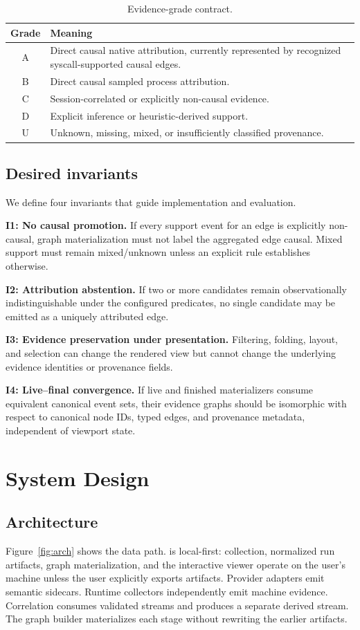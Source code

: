 \begin{table}[t]
\centering
\caption{Evidence-grade contract.}
\label{tab:grades}
\footnotesize
\begin{tabular}{c p{5.7cm}}
\toprule
Grade & Meaning \\
\midrule
A & Direct causal native attribution, currently represented by recognized syscall-supported causal edges. \\
B & Direct causal sampled process attribution. \\
C & Session-correlated or explicitly non-causal evidence. \\
D & Explicit inference or heuristic-derived support. \\
U & Unknown, missing, mixed, or insufficiently classified provenance. \\
\bottomrule
\end{tabular}
\end{table}

\subsection{Desired invariants}
We define four invariants that guide implementation and evaluation.

\textbf{I1: No causal promotion.} If every support event for an edge is explicitly non-causal, graph materialization must not label the aggregated edge causal. Mixed support must remain mixed/unknown unless an explicit rule establishes otherwise.

\textbf{I2: Attribution abstention.} If two or more candidates remain observationally indistinguishable under the configured predicates, no single candidate may be emitted as a uniquely attributed edge.

\textbf{I3: Evidence preservation under presentation.} Filtering, folding, layout, and selection can change the rendered view but cannot change the underlying evidence identities or provenance fields.

\textbf{I4: Live--final convergence.} If live and finished materializers consume equivalent canonical event sets, their evidence graphs should be isomorphic with respect to canonical node IDs, typed edges, and provenance metadata, independent of viewport state.

\section{System Design}
\subsection{Architecture}
Figure~\ref{fig:arch} shows the data path. \system is local-first: collection, normalized run artifacts, graph materialization, and the interactive viewer operate on the user's machine unless the user explicitly exports artifacts. Provider adapters emit semantic sidecars. Runtime collectors independently emit machine evidence. Correlation consumes validated streams and produces a separate derived stream. The graph builder materializes each stage without rewriting the earlier artifacts.

